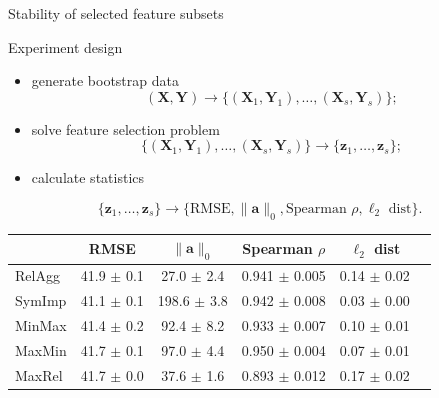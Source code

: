 \documentclass[9pt]{beamer}
\newcommand{\bz}{\mathbf{z}}
\newcommand{\ba}{\mathbf{a}}
\newcommand{\bY}{\mathbf{Y}}
\newcommand{\bX}{\mathbf{X}}
\begin{document}
\begin{frame}{Stability of selected feature subsets}
\begin{block}{Experiment design}
	\begin{itemize}
	\item generate bootstrap data
	\vspace{-0.1cm}
	\[
		(\bX, \bY) \rightarrow \bigl\{(\bX_1, \bY_1), \dots, (\bX_s, \bY_s)\bigr\};
	\]
	\item solve feature selection problem 
	\vspace{-0.1cm}
	\[
		 \bigl\{(\bX_1, \bY_1), \dots, (\bX_s, \bY_s)\bigr\}  \rightarrow \{\bz_1, \dots, \bz_s\};
	\]
	\item calculate statistics
	\vspace{-0.1cm}
	\end{itemize}
	\[
		\{\bz_1, \dots, \bz_s\} \rightarrow \{ \text{RMSE}, \|\ba\|_0, \text{Spearman }\rho, \ell_2 \text{ dist}\}.
	\]
\end{block}
\renewcommand{\arraystretch}{1.2}
\begin{table}[]
	\centering
	\begin{tabular}{l|ccccc}
		\hline
		& RMSE  & $\|\ba\|_0$ & Spearman $\rho$ & $\ell_2$ dist \\ \hline
		RelAgg & 41.9 $\pm$ 0.1 & 27.0 $\pm$ 2.4 & 0.941 $\pm$ 0.005 & 0.14 $\pm$ 0.02   \\
		SymImp & 41.1 $\pm$ 0.1 & 198.6 $\pm$ 3.8 & 0.942 $\pm$ 0.008 & 0.03 $\pm$ 0.00   \\
		MinMax & 41.4 $\pm$ 0.2 & 92.4 $\pm$ 8.2 & 0.933 $\pm$ 0.007 & 0.10 $\pm$ 0.01   \\
		MaxMin & 41.7 $\pm$ 0.1 & 97.0 $\pm$ 4.4 & 0.950 $\pm$ 0.004 & 0.07 $\pm$ 0.01   \\
		MaxRel & 41.7 $\pm$ 0.0 & 37.6 $\pm$ 1.6 & 0.893 $\pm$ 0.012 & 0.17 $\pm$ 0.02  \\ \hline
	\end{tabular}
\end{table}
\end{frame}
\end{document}
